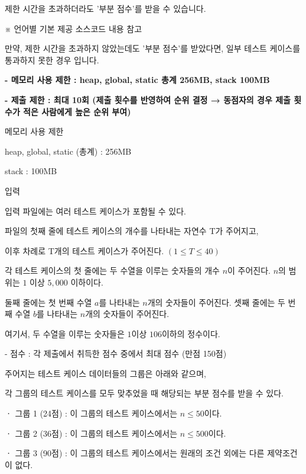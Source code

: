 \documentclass [12pt] {oblivoir}
\begin{document}
    제한 시간을 초과하더라도 '부분 점수'를 받을 수 있습니다.

    ※ 언어별 기본 제공 소스코드 내용 참고

    만약, 제한 시간을 초과하지 않았는데도 '부분 점수'를 받았다면, 일부 테스트 케이스를 통과하지 못한 경우 입니다.

\vspace{3mm}

\textbf{- 메모리 사용 제한 : heap, global, static 총계 256MB, stack 100MB}

\textbf{- 제출 제한 : 최대 10회 (제출 횟수를 반영하여 순위 결정 → 동점자의 경우 제출 횟수가 적은 사람에게 높은 순위 부여)}

\vspace{5mm}

메모리 사용 제한

heap, global, static (총계) : 256MB

stack : 100MB

\vspace{5mm}

입력

입력 파일에는 여러 테스트 케이스가 포함될 수 있다.

파일의 첫째 줄에 테스트 케이스의 개수를 나타내는 자연수 T가 주어지고,

이후 차례로 T개의 테스트 케이스가 주어진다. $(1 \le T \le 40)$

각 테스트 케이스의 첫 줄에는 두 수열을 이루는 숫자들의 개수 $n$이 주어진다. $n$의 범위는 $1$ 이상 $5,000$ 이하이다.

둘째 줄에는 첫 번째 수열 $a$를 나타내는 $n$개의 숫자들이 주어진다. 셋째 줄에는 두 번째 수열 $b$를 나타내는 $n$개의 숫자들이 주어진다.

여기서, 두 수열을 이루는 숫자들은 $1$이상 $106$이하의 정수이다.

- 점수 : 각 제출에서 취득한 점수 중에서 최대 점수 (만점 150점)

    주어지는 테스트 케이스 데이터들의 그룹은 아래와 같으며,

    각 그룹의 테스트 케이스를 모두 맞추었을 때 해당되는 부분 점수를 받을 수 있다.

    ㆍ 그룹 1 (24점) : 이 그룹의 테스트 케이스에서는 $n \le 50$이다.

    ㆍ 그룹 2 (36점) : 이 그룹의 테스트 케이스에서는 $n \le 500$이다.

    ㆍ 그룹 3 (90점) : 이 그룹의 테스트 케이스에서는 원래의 조건 외에는 다른 제약조건이 없다.

\vspace{5mm}
\end{document}

